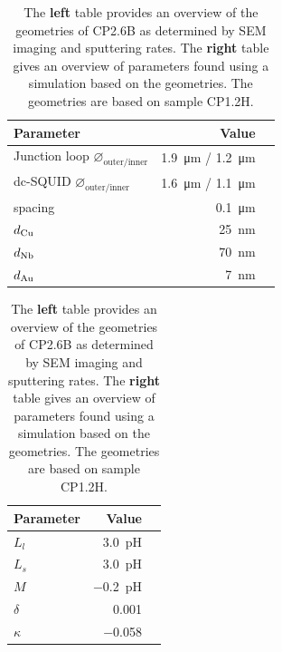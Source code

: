 \begin{table}
	\begin{subtable}{.7\linewidth}
		\begin{tabular}[t]{@{}lrr@{}}
			\toprule
			Parameter & Value \\ \midrule
			Junction loop $\diameter_{\text{outer/inner}}$ & \qty{1.9}{\micro\meter} / \qty{1.2}{\micro\meter} \\
			dc-SQUID $\diameter_{\text{outer/inner}}$ & \qty{1.6}{\micro\meter} / \qty{1.1}{\micro\meter} \\
			spacing & \qty{0.1}{\micro\meter} \\
			$d_{\ce{Cu}}$ & \qty{25}{\nano\meter} \\
			$d_{\ce{Nb}}$ & \qty{70}{\nano\meter} \\
			$d_{\ce{Au}}$ & \qty{7}{\nano\meter} \\
			\bottomrule
		\end{tabular}
    \end{subtable}
    \hfill
    \begin{subtable}{.3\linewidth}
    	\flushright
    	\begin{tabular}[t]{@{}lrr@{}}
    		\toprule
    		Parameter & Value \\ \midrule
    		$L_{l}$ & \qty{3.0}{\pico\henry} \\
			$L_{s}$ & \qty{3.0}{\pico\henry} \\
			$M$ & \qty{-0.2}{\pico\henry} \\
			$\delta$ & \num{0.001} \\
			$\kappa$ & \num{-0.058} \\
    		\bottomrule
    	\end{tabular}
    \end{subtable}
    \caption{The \textbf{left} table provides an overview of the geometries of CP2.6B as determined by SEM imaging and sputtering rates. The \textbf{right} table gives an overview of parameters found using a simulation based on the geometries. The geometries are based on sample CP1.2H.}
    \label{tab:CP2.6B-geometries}
\end{table}